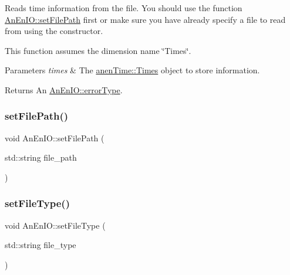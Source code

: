 Reads time information from the file. You should use the function \mbox{\hyperlink{class_an_en_i_o_a98066d375cc78694fda2af1ce37cc8d8}{An\+En\+I\+O\+::set\+File\+Path}} first or make sure you have already specify a file to read from using the constructor.

This function assumes the dimension name \char`\"{}\+Times\char`\"{}.


\begin{DoxyParams}{Parameters}
{\em times} & The \mbox{\hyperlink{classanen_time_1_1_times}{anen\+Time\+::\+Times}} object to store information. \\
\hline
\end{DoxyParams}
\begin{DoxyReturn}{Returns}
An \mbox{\hyperlink{class_an_en_i_o_aa56bc1ec6610b86db4349bce20f9ead0}{An\+En\+I\+O\+::error\+Type}}. 
\end{DoxyReturn}
\mbox{\label{class_an_en_i_o_a98066d375cc78694fda2af1ce37cc8d8}} 
\subsubsection{\texorpdfstring{set\+File\+Path()}{setFilePath()}}
{\footnotesize\ttfamily void An\+En\+I\+O\+::set\+File\+Path (\begin{DoxyParamCaption}\item[{std\+::string}]{file\+\_\+path }\end{DoxyParamCaption})}

\mbox{\label{class_an_en_i_o_a00fce5619b087353debcb2a602007f31}} 
\subsubsection{\texorpdfstring{set\+File\+Type()}{setFileType()}}
{\footnotesize\ttfamily void An\+En\+I\+O\+::set\+File\+Type (\begin{DoxyParamCaption}\item[{std\+::string}]{file\+\_\+type }\end{DoxyParamCaption})}

\mbox{\label{class_an_en_i_o_a0f3889bc1652077a4b41016393f0b7c6}} 
